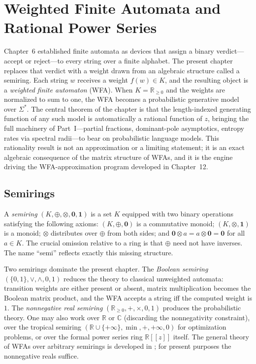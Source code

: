 \chapter{Weighted Finite Automata and Rational Power Series}
\label{ch07:top}

Chapter~6 established finite automata as devices that assign a binary verdict---accept or reject---to every string over a finite alphabet. The present chapter replaces that verdict with a weight drawn from an algebraic structure called a semiring. Each string $w$ receives a weight $f(w) \in K$, and the resulting object is a \emph{weighted finite automaton} (WFA). When $K = \mathbb{R}_{\ge 0}$ and the weights are normalized to sum to one, the WFA becomes a probabilistic generative model over $\Sigma^*$. The central theorem of the chapter is that the length-indexed generating function of any such model is automatically a rational function of $z$, bringing the full machinery of Part~I---partial fractions, dominant-pole asymptotics, entropy rates via spectral radii---to bear on probabilistic language models. This rationality result is not an approximation or a limiting statement; it is an exact algebraic consequence of the matrix structure of WFAs, and it is the engine driving the WFA-approximation program developed in Chapter~12.

\section{Semirings}

A \emph{semiring} $(K, \oplus, \otimes, \mathbf{0}, \mathbf{1})$ is a set $K$ equipped with two binary operations satisfying the following axioms: $(K, \oplus, \mathbf{0})$ is a commutative monoid; $(K, \otimes, \mathbf{1})$ is a monoid; $\otimes$ distributes over $\oplus$ from both sides; and $\mathbf{0} \otimes a = a \otimes \mathbf{0} = \mathbf{0}$ for all $a \in K$. The crucial omission relative to a ring is that $\oplus$ need not have inverses. The name ``semi'' reflects exactly this missing structure.

Two semirings dominate the present chapter. The \emph{Boolean semiring} $(\{0,1\}, \vee, \wedge, 0, 1)$ reduces the theory to classical unweighted automata: transition weights are either present or absent, matrix multiplication becomes the Boolean matrix product, and the WFA accepts a string iff the computed weight is $1$. The \emph{nonneg\-ative real semiring} $(\mathbb{R}_{\ge 0}, +, \times, 0, 1)$ produces the probabilistic theory. One may also work over $\mathbb{R}$ or $\mathbb{C}$ (discarding the nonnegativity constraint), over the tropical semiring $(\mathbb{R} \cup \{+\infty\}, \min, +, +\infty, 0)$ for optimization problems, or over the formal power series ring $\mathbb{R}[[z]]$ itself. The general theory of WFAs over arbitrary semirings is developed in \cite{DrosteKuichVogler2009}; for present purposes the nonnegative reals suffice.

